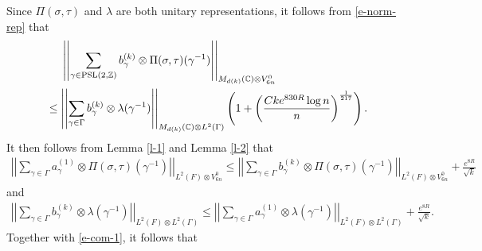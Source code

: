 \documentclass{amsart}
\theoremstyle{plain}
\theoremstyle{definition}
\theoremstyle{remark}
\begin{document}
Since $\Pi(\sigma,\tau)$ and $\lambda$ are both unitary representations, it follows from \eqref{e-norm-rep} that
\begin{equation}
\begin{aligned}\label{e-com-1}
&\ \ \ \ \left|\left|\sum\limits_{\gamma\in\textnormal{PSL}(2,\mathbb{Z})}b_\gamma^{(k)}\otimes\Pi(\sigma,\tau)(\gamma^{-1})\right|\right|_{M_{d(k)}(\mathbb{C})\otimes V_{6n}^0}\\
&\leq \left|\left|\sum\limits_{\gamma\in\Gamma}b_\gamma^{(k)}\otimes\lambda(\gamma^{-1})\right|\right|_{M_{d(k)}(\mathbb{C})\otimes L^2(\Gamma)}\left(1+\left(\frac{Cke^{830 R}\log n}{n}\right)^{\frac{1}{217}}\right).
\end{aligned}
\end{equation}
It then follows from Lemma \ref{l-1} and Lemma \ref{l-2} that
\begin{align*}
\left|\left|\sum\limits_{\gamma\in\Gamma}a_\gamma^{(1)}\otimes\Pi(\sigma,\tau)(\gamma^{-1})\right|\right|_{L^2(F)\otimes V_{6n}^0}\leq \left|\left|\sum\limits_{\gamma\in\Gamma}b_\gamma^{(k)}\otimes\Pi(\sigma,\tau)(\gamma^{-1})\right|\right|_{L^2(F)\otimes V_{6n}^0}+\frac{e^{8R}}{\sqrt{k}}
\end{align*}
and 
\begin{align*}
\left|\left|\sum\limits_{\gamma\in\Gamma}b_\gamma^{(k)}\otimes\lambda(\gamma^{-1})\right|\right|_{L^2(F)\otimes L^2(\Gamma)}\leq \left|\left|\sum\limits_{\gamma\in\Gamma}a_\gamma^{(1)}\otimes\lambda(\gamma^{-1})\right|\right|_{L^2(F)\otimes L^2(\Gamma)}+\frac{e^{8R}}{\sqrt{k}}.
\end{align*}
Together with \eqref{e-com-1}, it follows that 
\end{document}
